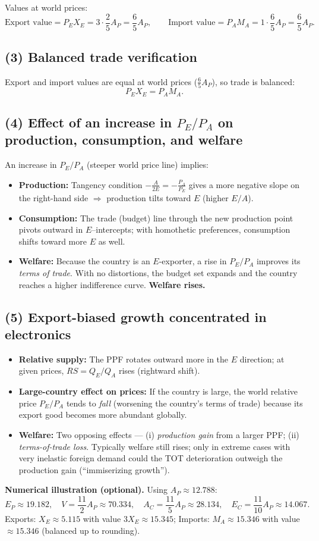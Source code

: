 \documentclass[12pt]{article}
\begin{document}
Values at world prices:
\[
\text{Export value} = P_E X_E = 3\cdot \frac{2}{5}A_P = \frac{6}{5}A_P,\qquad
\text{Import value} = P_A M_A = 1\cdot \frac{6}{5}A_P = \frac{6}{5}A_P.
\]

\subsection*{(3) Balanced trade verification}
Export and import values are equal at world prices ($\frac{6}{5}A_P$), so trade is balanced:
\[
P_E X_E = P_A M_A.
\]

\subsection*{(4) Effect of an increase in $P_E/P_A$ on production, consumption, and welfare}
An increase in $P_E/P_A$ (steeper world price line) implies:
\begin{itemize}
\item \textbf{Production:} Tangency condition $-\frac{A}{2E} = -\frac{P_A}{P_E}$ gives a more negative slope on the right-hand side $\Rightarrow$ production tilts toward $E$ (higher $E/A$).
\item \textbf{Consumption:} The trade (budget) line through the new production point pivots outward in $E$--intercepts; with homothetic preferences, consumption shifts toward more $E$ as well.
\item \textbf{Welfare:} Because the country is an $E$-exporter, a rise in $P_E/P_A$ improves its \emph{terms of trade}. With no distortions, the budget set expands and the country reaches a higher indifference curve. \textbf{Welfare rises.}
\end{itemize}

\subsection*{(5) Export-biased growth concentrated in electronics}
\begin{itemize}
\item \textbf{Relative supply:} The PPF rotates outward more in the $E$ direction; at given prices, $RS=Q_E/Q_A$ rises (rightward shift).
\item \textbf{Large-country effect on prices:} If the country is large, the world relative price $P_E/P_A$ tends to \emph{fall} (worsening the country’s terms of trade) because its export good becomes more abundant globally.
\item \textbf{Welfare:} Two opposing effects --- (i) \emph{production gain} from a larger PPF; (ii) \emph{terms-of-trade loss}. Typically welfare still rises; only in extreme cases with very inelastic foreign demand could the TOT deterioration outweigh the production gain (``immiserizing growth'').
\end{itemize}

\bigskip
\textbf{Numerical illustration (optional).} Using $A_P\approx 12.788$:
\[
E_P \approx 19.182,\quad V=\frac{11}{2}A_P\approx 70.334,\quad
A_C=\frac{11}{5}A_P\approx 28.134,\quad E_C=\frac{11}{10}A_P\approx 14.067.
\]
Exports: $X_E\approx 5.115$ with value $3X_E\approx 15.345$; Imports: $M_A\approx 15.346$ with value $\approx 15.346$ (balanced up to rounding).
\end{document}
